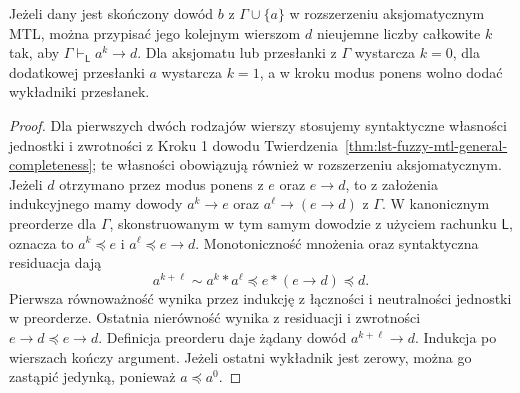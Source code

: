 \begin{stwierdzenie}
\label{prop:ncl-deduction-exponent}
Jeżeli dany jest skończony dowód $b$ z $\Gamma\cup\{a\}$
w rozszerzeniu aksjomatycznym MTL, można przypisać jego
kolejnym wierszom $d$ nieujemne liczby całkowite $k$
tak, aby $\Gamma\vdash_{\mathsf L}a^k\to d$.
Dla aksjomatu lub przesłanki z $\Gamma$ wystarcza $k=0$,
dla dodatkowej przesłanki $a$ wystarcza $k=1$,
a w kroku modus ponens wolno dodać wykładniki przesłanek.
\end{stwierdzenie}
\begin{proof}
Dla pierwszych dwóch rodzajów wierszy stosujemy syntaktyczne
własności jednostki i zwrotności z Kroku 1 dowodu
Twierdzenia~\ref{thm:lst-fuzzy-mtl-general-completeness};
te własności obowiązują również w rozszerzeniu aksjomatycznym.
Jeżeli $d$ otrzymano przez modus ponens z $e$ oraz $e\to d$,
to z założenia indukcyjnego mamy dowody
$a^k\to e$ oraz $a^\ell\to(e\to d)$ z $\Gamma$.
W kanonicznym preorderze dla $\Gamma$, skonstruowanym
w tym samym dowodzie z użyciem rachunku $\mathsf L$,
oznacza to $a^k\preccurlyeq e$ i
$a^\ell\preccurlyeq e\to d$. Monotoniczność mnożenia
oraz syntaktyczna residuacja dają
\[
 a^{k+\ell}\sim a^k*a^\ell
 \preccurlyeq e*(e\to d)\preccurlyeq d.
\]
Pierwsza równoważność wynika przez indukcję z łączności
i neutralności jednostki w preorderze. Ostatnia nierówność
wynika z residuacji i zwrotności $e\to d\preccurlyeq e\to d$.
Definicja preorderu daje żądany dowód
$a^{k+\ell}\to d$. Indukcja po wierszach kończy argument.
Jeżeli ostatni wykładnik jest zerowy, można go zastąpić
jedynką, ponieważ $a\preccurlyeq a^0$.
\end{proof}

